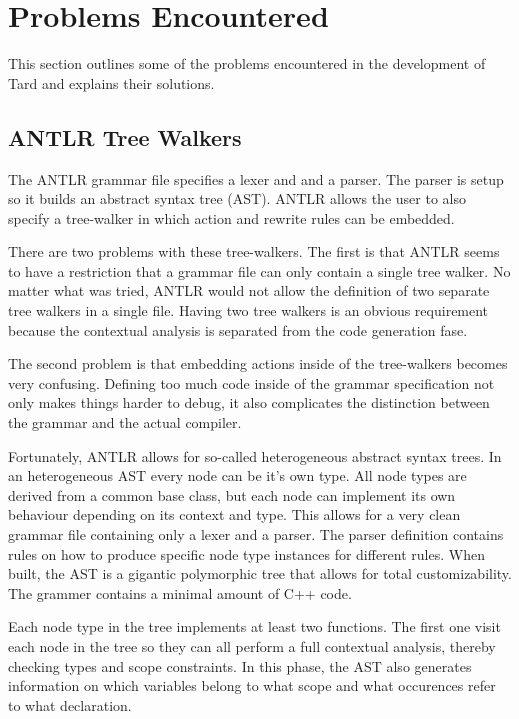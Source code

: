 \documentclass{report}
\begin{document}
\chapter{Problems Encountered}

This section outlines some of the problems encountered in the development of Tard and explains their solutions.

\section{ANTLR Tree Walkers}

The ANTLR grammar file specifies a lexer and and a parser. The parser is setup so it builds an abstract syntax tree (AST). ANTLR allows
the user to also specify a tree-walker in which action and rewrite rules can be embedded.

There are two problems with these tree-walkers. The first is that ANTLR seems to have a restriction that a grammar file can
only contain a single tree walker. No matter what was tried, ANTLR would not allow the definition of two separate tree walkers in
a single file. Having two tree walkers is an obvious requirement because the contextual analysis is separated from the code generation fase.

The second problem is that embedding actions inside of the tree-walkers becomes very confusing. Defining too much code inside of the grammar
specification not only makes things harder to debug, it also complicates the distinction between the grammar and the actual compiler.

Fortunately, ANTLR allows for so-called heterogeneous abstract syntax trees. In an heterogeneous AST every node can be it's own type. All node types
are derived from a common base class, but each node can implement its own behaviour depending on its context and type. This allows for a very
clean grammar file containing only a lexer and a parser. The parser definition contains rules on how to produce specific node type instances for
different rules. When built, the AST is a gigantic polymorphic tree that allows for total customizability. The grammer contains a minimal amount
of C++ code.

Each node type in the tree implements at least two functions. The first one visit each node in the tree so they can all perform
a full contextual analysis, thereby checking types and scope constraints. In this phase, the AST also generates information on which variables
belong to what scope and what occurences refer to what declaration.
\end{document}
